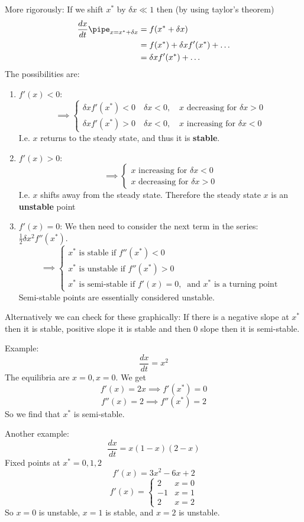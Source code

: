 \documentclass{X:/Documents/Coding/Latex/myassignment}
\begin{document}
More rigorously:
If we shift $x^*$ by $\delta x \ll 1$ then (by using taylor's theorem)
\begin{align*}
\frac{dx}{dt}\pipe_{x=x^*+\delta x} &= f(x^* + \delta x)\\
&= f(x^*) + \delta x f'(x^*) + \hdots\\
&= \delta x f'(x^*) + \hdots
\end{align*}
The possibilities are:
\begin{enumerate}
    \item $f'(x) < 0 $: 
    \[\implies \begin{cases}\delta x f'(x^*) < 0 \quad \delta x < 0, \quad x\text{ decreasing for } \delta x > 0\\
    \delta x f'(x^*) > 0\quad \delta x < 0, \quad x \text{ increasing for } \delta x <0\end{cases}\]
    I.e. $x$ returns to the steady state, and thus it is \textbf{stable}.
    \item $f'(x) > 0 $: 
    \[\implies \begin{cases}x \text{ increasing for } \delta x <0\\
    x \text{ decreasing for } \delta x > 0\end{cases}\]
    I.e. $x$ shifts away from the steady state. Therefore the steady state $x$ is an \textbf{unstable} point
    \item $f'(x) = 0 $: We then need to consider the next term in the series: $\frac12 \delta x^2 f''(x^*)$.
    \[\implies \begin{cases}x^* \text{ is stable if } f''(x^*) < 0\\
    x^* \text{ is unstable if } f''(x^*) > 0 \\
    x^* \text{ is semi-stable if } f'(x) = 0, \ \text{ and }x^* \text{ is a turning point}
    \end{cases}\]
    Semi-stable points are essentially considered unstable.
\end{enumerate}
Alternatively we can check for these graphically:
If there is a negative slope at $x^*$ then it is stable, positive slope it is stable and then $0$ slope then it is semi-stable.

Example:
\[\frac{dx}{dt} = x^2\]
The equilibria are $x=0, x=0$.
We get
\[f'(x) = 2x \implies f'(x^*)= 0\]
\[f''(x) = 2 \implies f''(x^*) = 2\]
So we find that $x^*$ is semi-stable.

Another example:
\[\frac{dx}{dt} = x(1-x)(2-x)\]
Fixed points at $x^*=0,1,2$
\[f'(x) = 3x^2 - 6x + 2\]
\[f'(x) = \begin{cases}2 & x=0\\ -1 & x=1\\2&x=2\end{cases}\]
So $x=0$ is unstable, $x=1$ is stable, and $x=2$ is unstable.
\end{document}
